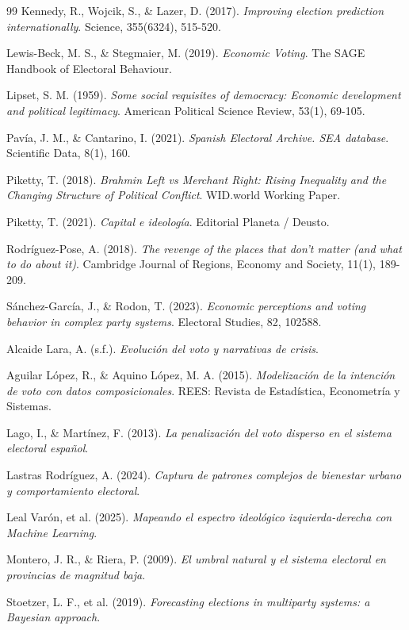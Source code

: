\begin{thebibliography}{99}
Kennedy, R., Wojcik, S., \& Lazer, D. (2017). \textit{Improving election prediction internationally}. Science, 355(6324), 515-520.

Lewis-Beck, M. S., \& Stegmaier, M. (2019). \textit{Economic Voting}. The SAGE Handbook of Electoral Behaviour.

Lipset, S. M. (1959). \textit{Some social requisites of democracy: Economic development and political legitimacy}. American Political Science Review, 53(1), 69-105.

Pavía, J. M., \& Cantarino, I. (2021). \textit{Spanish Electoral Archive. SEA database}. Scientific Data, 8(1), 160.

Piketty, T. (2018). \textit{Brahmin Left vs Merchant Right: Rising Inequality and the Changing Structure of Political Conflict}. WID.world Working Paper.

Piketty, T. (2021). \textit{Capital e ideología}. Editorial Planeta / Deusto.

Rodríguez-Pose, A. (2018). \textit{The revenge of the places that don't matter (and what to do about it)}. Cambridge Journal of Regions, Economy and Society, 11(1), 189-209.

Sánchez-García, J., \& Rodon, T. (2023). \textit{Economic perceptions and voting behavior in complex party systems}. Electoral Studies, 82, 102588.

Alcaide Lara, A. (s.f.). \textit{Evolución del voto y narrativas de crisis}.

Aguilar López, R., \& Aquino López, M. A. (2015). \textit{Modelización de la intención de voto con datos composicionales}. REES: Revista de Estadística, Econometría y Sistemas.

Lago, I., \& Martínez, F. (2013). \textit{La penalización del voto disperso en el sistema electoral español}.

Lastras Rodríguez, A. (2024). \textit{Captura de patrones complejos de bienestar urbano y comportamiento electoral}.

Leal Varón, et al. (2025). \textit{Mapeando el espectro ideológico izquierda-derecha con Machine Learning}.

Montero, J. R., \& Riera, P. (2009). \textit{El umbral natural y el sistema electoral en provincias de magnitud baja}.

Stoetzer, L. F., et al. (2019). \textit{Forecasting elections in multiparty systems: a Bayesian approach}.

\end{thebibliography}
